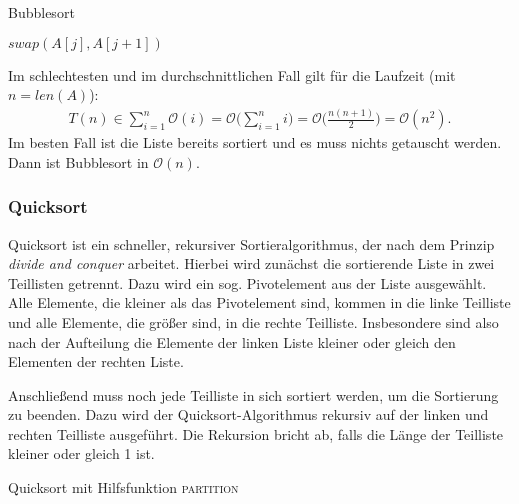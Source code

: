 \begin{algorithm}
	\caption{Bubblesort}
	\begin{algorithmic}[0]
		\State $swap(A[j], A[j+1])$
		\EndIf
		\EndFor
		\EndFor
	\end{algorithmic}
\end{algorithm}

\begin{proposition}[Laufzeit]
	Im schlechtesten und im durchschnittlichen Fall gilt für die Laufzeit (mit $n = len(A)$):
	\begin{gather*}
		T(n) \in \sum\limits_{i=1}^n \mathcal{O}(i) = \mathcal{O}\Big( \sum\limits_{i=1}^n{i} \Big) = \mathcal{O}\Big( \frac{n(n+1)}{2} \Big) = \mathcal{O}(n^2).
	\end{gather*}
	Im besten Fall ist die Liste bereits sortiert und es muss nichts getauscht werden. Dann ist Bubblesort in $\mathcal{O}(n)$.
\end{proposition}

\subsubsection{Quicksort}
Quicksort ist ein schneller, rekursiver Sortieralgorithmus, der nach dem Prinzip \emph{divide and conquer} arbeitet. Hierbei wird zunächst die sortierende Liste in zwei Teillisten getrennt. Dazu wird ein sog. Pivotelement aus der Liste ausgewählt. Alle Elemente, die kleiner als das Pivotelement sind, kommen in die linke Teilliste und alle Elemente, die größer sind, in die rechte Teilliste. Insbesondere sind also nach der Aufteilung die Elemente der linken Liste kleiner oder gleich den Elementen der rechten Liste.

Anschließend muss noch jede Teilliste in sich sortiert werden, um die Sortierung zu beenden. Dazu wird der Quicksort-Algorithmus rekursiv auf der linken und rechten Teilliste ausgeführt. Die Rekursion bricht ab, falls die Länge der Teilliste kleiner oder gleich 1 ist.

\begin{algorithm}
	\caption{Quicksort mit Hilfsfunktion \textsc{partition}}
	\begin{algorithmic}
		 
		\State {}
		\State {} 
		\State {} 
		\EndIf
		\EndProcedure
	\end{algorithmic}
\end{algorithm}


